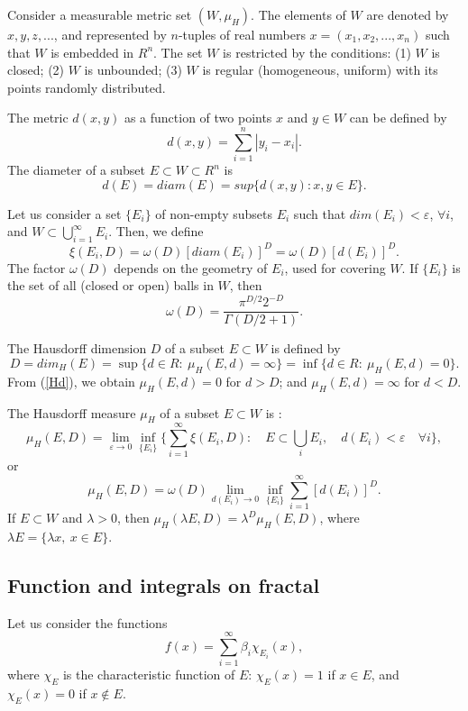 \documentclass[12pt]{article}
\newcommand{\be}{\begin{equation}}
\newcommand{\ee}{\end{equation}}
\begin{document}
Consider a measurable metric set $(W, \mu_H)$. 
The elements of $W$ are denoted by $x, y, z, . . . $, and represented by 
$n$-tuples of real numbers $x = (x_1,x_2,...,x_n)$ 
such that $W$ is embedded in $R^n$. 
The set $W$ is restricted by the conditions:
(1) $W$ is closed;
(2) $W$ is unbounded; 
(3) $W$ is regular (homogeneous, uniform) with its points randomly distributed.

The metric $d(x,y)$ as a function of two points $x$ and $y \in W$ 
can be defined  by
\be
d(x,y)=\sum^n_{i=1} |y_i-x_i| .
\ee
The diameter of a subset $E \subset W \subset R^n$ is 
\[
d(E)=diam(E)=sup\{ d(x,y): x , y  \in E \} .
\]

Let us consider a set $\{E_i\}$ of non-empty 
subsets $E_i$ such that
$dim(E_i) < \varepsilon$,  $\forall i$, and 
$W \subset \bigcup^{\infty}_{i=1} E_i$.
Then, we define 
\be
\xi(E_i,D)= \omega(D) [diam (E_i)]^D=\omega(D)  [d(E_i)]^D .
\ee
The factor $\omega(D)$ 
depends on the geometry of $E_i$, used for covering $W$.
If $\{E_i\}$ is the set of all (closed or open) balls in $W$, then
\be
\omega(D)=\frac{\pi^{D/2} 2^{-D}}{\Gamma(D/2+1)}. 
\ee

The Hausdorff dimension $D$ of a subset $E \subset W$  
is  defined \cite{Federer,R} by
\be \label{Hd}
D= dim_H (E)=\sup \{ d \in R: \  \mu_H (E, d ) = \infty  \} 
=\inf\{ d \in R : \ \mu_H(E,d)=0 \}.
\ee
From (\ref{Hd}), we obtain 
$\mu_H(E,d)=0$ for $d>D$; and
$\mu_H(E,d)=\infty$ for $d<D$. 


The Hausdorff measure $\mu_H$ of a subset $E \subset W $ 
is \cite{Federer,R}:
\be
\mu_H(E,D)=
\lim_{\varepsilon \rightarrow 0} \inf_{\{E_i\}} 
\{ \sum^{\infty}_{i=1} \xi(E_i,D): 
\quad E \subset \bigcup_i E_i , \quad d(E_i)< \varepsilon \quad \forall i \} ,
\ee
or
\be 
\mu_H(E,D)= \omega(D) \lim_{d(E_i) \rightarrow 0} 
\inf_{\{E_i\}} \sum^{\infty}_{i=1} [d(E_i)]^D .
\ee
If $E \subset W$ and $\lambda >0$, then
$\mu_H(\lambda E,D) =\lambda^D \mu_H(E,D)$, 
where $\lambda E =\{ \lambda x, \ x \in E \}$.



\subsection{Function and integrals on fractal}

Let us consider the functions  
\be \label{f}
f(x)=\sum^{\infty}_{i=1} \beta_i \chi_{E_i}(x) , 
\ee
where $\chi_{E}$ is the characteristic function of $E$: 
$\chi_{E}(x)=1$ if $x \in E$, and $\chi_{E}(x)=0$ if $x \not \in E$. 
\end{document}

